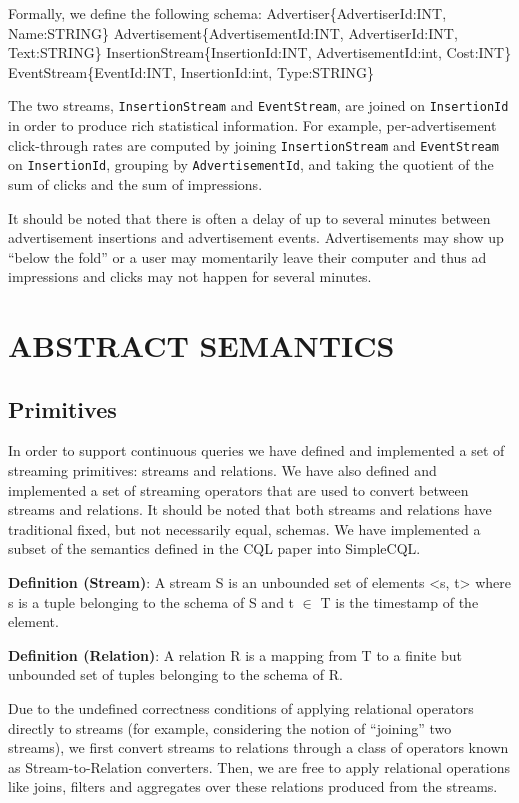 \documentclass[a4paper, 10pt, conference]{IEEEconf}
\begin{document}
Formally, we define the following schema:
Advertiser\{AdvertiserId:INT, Name:STRING\}
Advertisement\{AdvertisementId:INT, AdvertiserId:INT, Text:STRING\}
InsertionStream\{InsertionId:INT, AdvertisementId:int, Cost:INT\}
EventStream\{EventId:INT, InsertionId:int, Type:STRING\}

The two streams, \texttt{InsertionStream} and \texttt{EventStream}, are joined on \texttt{InsertionId} in order to produce rich statistical information.  For example, per-advertisement click-through rates are computed by joining \texttt{InsertionStream} and \texttt{EventStream} on \texttt{InsertionId}, grouping by \texttt{AdvertisementId}, and taking the quotient of the sum of clicks and the sum of impressions.

It should be noted that there is often a delay of up to several minutes between advertisement insertions and advertisement events.  Advertisements may show up “below the fold” or a user may momentarily leave their computer and thus ad impressions and clicks may not happen for several minutes.

\section{ABSTRACT SEMANTICS}

\subsection{Primitives}
In order to support continuous queries we have defined and implemented a set of streaming primitives: streams and relations.  We have also defined and implemented a set of streaming operators that are used to convert between streams and relations.  It should be noted that both streams and relations have traditional fixed, but not necessarily equal, schemas. We have implemented a subset of the semantics defined in the CQL paper \cite{cql} into SimpleCQL.

\textbf{Definition (Stream)}: A stream S is an unbounded set of elements <s, t> where s is a tuple belonging to the schema of S and t $\in$ T is the timestamp of the element.

\textbf{Definition (Relation)}:  A relation R is a mapping from T to a finite but unbounded set of tuples belonging to the schema of R.

Due to the undefined correctness conditions of applying relational operators directly to streams (for example, considering the notion of “joining” two streams), we first convert streams to relations through a class of operators known as Stream-to-Relation converters. Then, we are free to apply relational operations like joins, filters and aggregates over these relations produced from the streams. 
\end{document}
